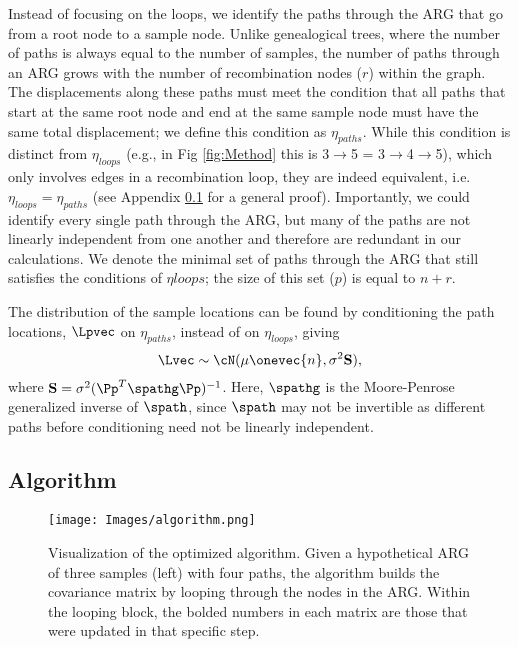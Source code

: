 Instead of focusing on the loops, we identify the paths through the ARG that go from a root node to a sample node. Unlike genealogical trees, where the number of paths is always equal to the number of samples, the number of paths through an ARG grows with the number of recombination nodes ($r$) within the graph. The displacements along these paths must meet the condition that all paths that start at the same root node and end at the same sample node must have the same total displacement; we define this condition as $\eta_{paths}$. While this condition is distinct from $\eta_{loops}$ (e.g.,  in Fig \ref{fig:Method} this is 3$\rightarrow$5 = 3$\rightarrow$4$\rightarrow$5), which only involves edges in a recombination loop, they are indeed equivalent, i.e. $\eta_{loops} = \eta_{paths}$ (see Appendix \ref{} for a general proof). Importantly, we could identify every single path through the ARG, but many of the paths are not linearly independent from one another and therefore are redundant in our calculations. We denote the minimal set of paths through the ARG that still satisfies the conditions of $\eta{loops}$; the size of this set ($p$) is equal to $n+r$.

The distribution of the sample locations can be found by conditioning the path locations, $\Lpvec$ on $\eta_{paths}$, instead of on $\eta_{loops}$, giving
\begin{equation}
\Lvec \sim \cN(\mu \onevec{n},\sigma^2 \mathbf{S} ),
\end{equation}
where $\mathbf{S} = \sigma^2 (\Pp^T\spathg\Pp)^{-1} $. Here, $\spathg$ is the Moore-Penrose generalized inverse of $\spath$, since $\spath$ may not be invertible as different paths before conditioning need not be linearly independent. 

\subsection{Algorithm}

\begin{figure}[htp]
    \centering
    \texttt{[image: Images/algorithm.png]}
    \caption{Visualization of the optimized algorithm. Given a hypothetical ARG of three samples (left) with four paths, the algorithm builds the covariance matrix by looping through the nodes in the ARG. Within the looping block, the bolded numbers in each matrix are those that were updated in that specific step.}
    \label{fig:algorithm}
\end{figure}


